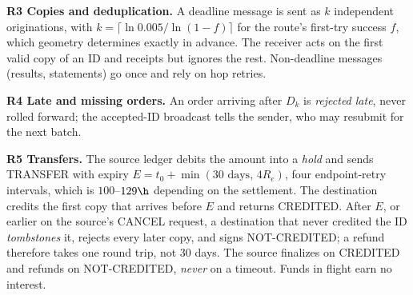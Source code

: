 \textbf{R3 Copies and deduplication.} A deadline message is sent as $k$ independent originations, with $k=\lceil\ln 0.005/\ln(1-f)\rceil$ for the route's first-try success $f$, which geometry determines exactly in advance. The receiver acts on the first valid copy of an ID and receipts but ignores the rest. Non-deadline messages (results, statements) go once and rely on hop retries.

\textbf{R4 Late and missing orders.} An order arriving after $D_k$ is \emph{rejected late}, never rolled forward; the accepted-ID broadcast tells the sender, who may resubmit for the next batch.

\textbf{R5 Transfers.} The source ledger debits the amount into a \emph{hold} and sends TRANSFER with expiry $E = t_0 + \min(30\text{ days},\,4R_e)$, four endpoint-retry intervals, which is $100$--$129\h$ depending on the settlement. The destination credits the first copy that arrives before $E$ and returns CREDITED. After $E$, or earlier on the source's CANCEL request, a destination that never credited the ID \emph{tombstones} it, rejects every later copy, and signs NOT-CREDITED; a refund therefore takes one round trip, not 30 days. The source finalizes on CREDITED and refunds on NOT-CREDITED, \emph{never} on a timeout. Funds in flight earn no interest.

